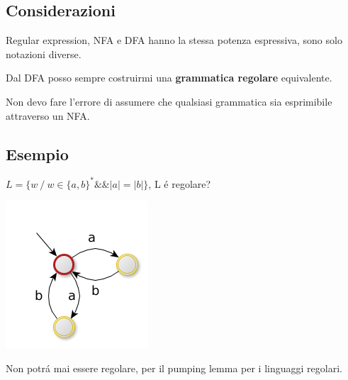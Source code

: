 \subsection{Considerazioni}
\begin{tcolorbox}\begin{center}
    Regular expression, NFA e DFA hanno la stessa potenza espressiva, sono solo notazioni diverse.\\
\end{center}\end{tcolorbox}

\begin{tcolorbox}\begin{center}
    Dal DFA posso sempre costruirmi una \textbf{grammatica regolare} equivalente.\\
\end{center}\end{tcolorbox}

\begin{tcolorbox}\begin{center}
    Non devo fare l'errore di assumere che qualsiasi grammatica sia esprimibile attraverso un NFA.\\
\end{center}\end{tcolorbox}
\subsection{Esempio}
$L=\{ w \ / \ w \in \{ a, b \} ^* \&\& |a|=|b|\}$, L \'e regolare?
\begin{center}
	\includegraphics[scale=0.5]{Chapters/Img/c02_13.png}\\
\end{center} 
Non potr\'a mai essere regolare, per il pumping lemma per i linguaggi regolari.

